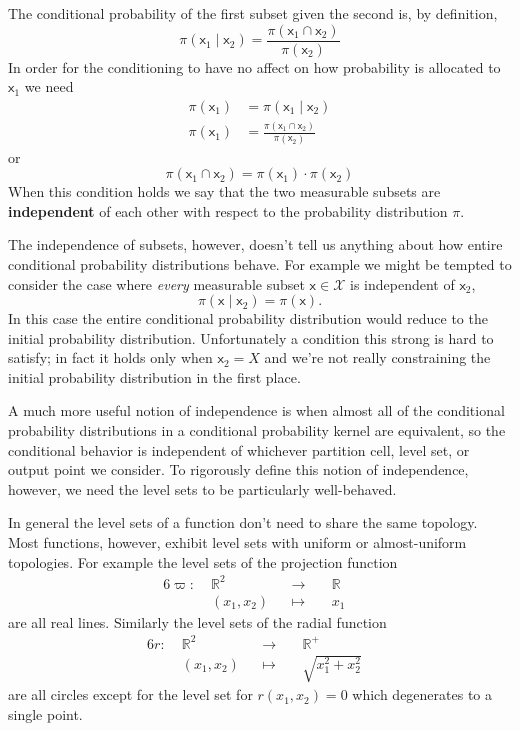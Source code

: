 \documentclass[
  letterpaper,
  DIV=11,
  numbers=noendperiod]{scrartcl}
\begin{document}
The conditional probability of the first subset given the second is, by
definition, \[
\pi( \mathsf{x}_{1} \mid \mathsf{x}_{2} )
=
\frac{ \pi( \mathsf{x}_{1} \cap \mathsf{x}_{2} ) }
{ \pi( \mathsf{x}_{2} ) }
\] In order for the conditioning to have no affect on how probability is
allocated to \(\mathsf{x}_{1}\) we need \begin{align*}
\pi( \mathsf{x}_{1} )
&=
\pi( \mathsf{x}_{1} \mid \mathsf{x}_{2} )
\\
\pi( \mathsf{x}_{1} )
&=
\frac{ \pi( \mathsf{x}_{1} \cap \mathsf{x}_{2} ) }
{ \pi( \mathsf{x}_{2} ) }
\end{align*} or \[
\pi( \mathsf{x}_{1} \cap \mathsf{x}_{2} )
=
\pi( \mathsf{x}_{1} ) \cdot \pi( \mathsf{x}_{2} )
\] When this condition holds we say that the two measurable subsets are
\textbf{independent} of each other with respect to the probability
distribution \(\pi\).

The independence of subsets, however, doesn't tell us anything about how
entire conditional probability distributions behave. For example we
might be tempted to consider the case where \emph{every} measurable
subset \(\mathsf{x} \in \mathcal{X}\) is independent of
\(\mathsf{x}_{2}\), \[
\pi ( \mathsf{x} \mid \mathsf{x}_{2} ) = \pi( \mathsf{x} ).
\] In this case the entire conditional probability distribution would
reduce to the initial probability distribution. Unfortunately a
condition this strong is hard to satisfy; in fact it holds only when
\(\mathsf{x}_{2} = X\) and we're not really constraining the initial
probability distribution in the first place.

A much more useful notion of independence is when almost all of the
conditional probability distributions in a conditional probability
kernel are equivalent, so the conditional behavior is independent of
whichever partition cell, level set, or output point we consider. To
rigorously define this notion of independence, however, we need the
level sets to be particularly well-behaved.

In general the level sets of a function don't need to share the same
topology. Most functions, however, exhibit level sets with uniform or
almost-uniform topologies. For example the level sets of the projection
function \begin{alignat*}{6}
\varpi :\; &\mathbb{R}^{2}& &\rightarrow& \; &\mathbb{R}&
\\
&(x_{1}, x_{2})& &\mapsto& &x_{1}&
\end{alignat*} are all real lines. Similarly the level sets of the
radial function \begin{alignat*}{6}
r :\; &\mathbb{R}^{2}& &\rightarrow& \; &\mathbb{R}^{+}&
\\
&(x_{1}, x_{2})& &\mapsto& &\sqrt{ x_{1}^{2} + x_{2}^{2} }&
\end{alignat*} are all circles except for the level set for
\(r(x_{1}, x_{2}) = 0\) which degenerates to a single point.
\end{document}
